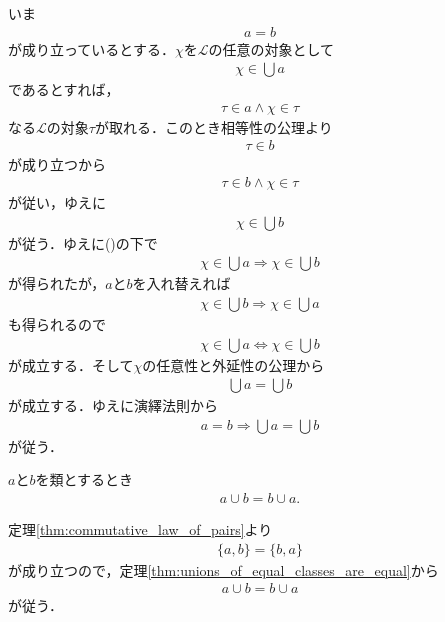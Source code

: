 	\begin{sketch}
		いま
		\begin{align}
			a = b
			\label{fom:thm_unions_of_equal_classes_are_equal}
		\end{align}
		が成り立っているとする．$\chi$を$\mathcal{L}$の任意の対象として
		\begin{align}
			\chi \in \bigcup a
		\end{align}
		であるとすれば，
		\begin{align}
			\tau \in a \wedge \chi \in \tau
		\end{align}
		なる$\mathcal{L}$の対象$\tau$が取れる．このとき相等性の公理より
		\begin{align}
			\tau \in b
		\end{align}
		が成り立つから
		\begin{align}
			\tau \in b \wedge \chi \in \tau
		\end{align}
		が従い，ゆえに
		\begin{align}
			\chi \in \bigcup b
		\end{align}
		が従う．ゆえに()の下で
		\begin{align}
			\chi \in \bigcup a \Longrightarrow \chi \in \bigcup b
		\end{align}
		が得られたが，$a$と$b$を入れ替えれば
		\begin{align}
			\chi \in \bigcup b \Longrightarrow \chi \in \bigcup a
		\end{align}
		も得られるので
		\begin{align}
			\chi \in \bigcup a \Longleftrightarrow \chi \in \bigcup b
		\end{align}
		が成立する．そして$\chi$の任意性と外延性の公理から
		\begin{align}
			\bigcup a = \bigcup b
		\end{align}
		が成立する．ゆえに演繹法則から
		\begin{align}
			a = b \Longrightarrow \bigcup a = \bigcup b
		\end{align}
		が従う．
		\QED
	\end{sketch}
	
	\begin{screen}
		\begin{thm}[合併の可換律]
			$a$と$b$を類とするとき
			\begin{align}
				a \cup b = b \cup a.
			\end{align}
		\end{thm}
	\end{screen}
	
	\begin{sketch}
		定理\ref{thm:commutative_law_of_pairs}より
		\begin{align}
			\{a,b\} = \{b,a\}
		\end{align}
		が成り立つので，定理\ref{thm:unions_of_equal_classes_are_equal}から
		\begin{align}
			a \cup b = b \cup a
		\end{align}
		が従う．
		\QED
	\end{sketch}